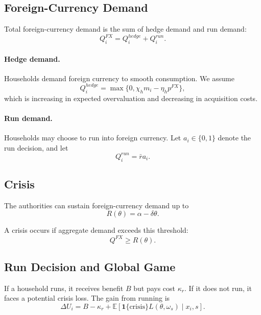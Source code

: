 \subsection{Foreign-Currency Demand}

Total foreign-currency demand is the sum of hedge demand and run demand:
\begin{equation}
 Q_i^{FX} = Q_i^{hedge} + Q_i^{run}.
\end{equation}

\paragraph{Hedge demand.} Households demand foreign currency to smooth consumption. We assume
\begin{equation}
 Q_i^{hedge} = \max\{0, \chi_h m_i - \eta_h p^{FX}\},
\end{equation}
which is increasing in expected overvaluation and decreasing in acquisition costs.

\paragraph{Run demand.} Households may choose to run into foreign currency. Let $a_i \in \{0,1\}$ denote the run decision, and let
\begin{equation}
 Q_i^{run} = \bar r a_i.
\end{equation}

\subsection{Crisis}

The authorities can sustain foreign-currency demand up to
\begin{equation}
 R(\theta) = \alpha - \delta \theta.
\end{equation}

A crisis occurs if aggregate demand exceeds this threshold:
\begin{equation}
 Q^{FX} \ge R(\theta).
\end{equation}

\subsection{Run Decision and Global Game}

If a household runs, it receives benefit $B$ but pays cost $\kappa_r$. If it does not run, it faces a potential crisis loss. The gain from running is
\begin{equation}
 \Delta U_i = B - \kappa_r + \mathbb{E}[\mathbf{1}\{\text{crisis}\} L(\theta,\omega_s) \mid x_i,s].
\end{equation}

